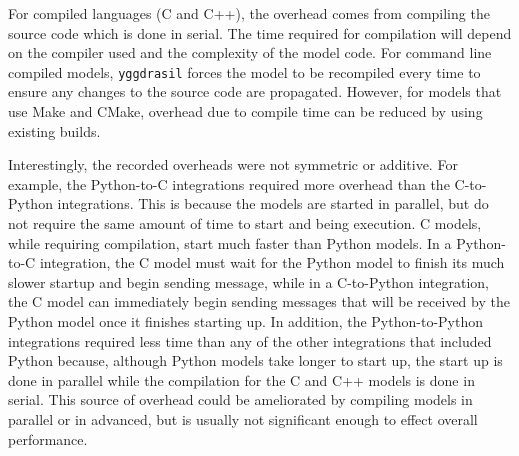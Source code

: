 \documentclass[journal]{IEEEtran}
\newcommand{\pkg}{{\tt yggdrasil}{}}
\begin{document}
For compiled languages (C and C++), the overhead comes from compiling the source code which is done in serial. The time required for compilation will depend on the compiler used and the complexity of the model code. For command line compiled models, {\pkg} forces the model to be recompiled every time to ensure any changes to the source code are propagated. However, for models that use Make and CMake, overhead due to compile time can be reduced by using existing builds.

Interestingly, the recorded overheads were not symmetric or additive. For example, the Python-to-C integrations required more overhead than the C-to-Python integrations. This is because the models are started in parallel, but do not require the same amount of time to start and being execution. C models, while requiring compilation, start much faster than Python models. In a Python-to-C integration, the C model must wait for the Python model to finish its much slower startup and begin sending message, while in a C-to-Python integration, the C model can immediately begin sending messages that will be received by the Python model once it finishes starting up. In addition, the Python-to-Python integrations required less time than any of the other integrations that included Python because, although Python models take longer to start up, the start up is done in parallel while the compilation for the C and C++ models is done in serial. This source of overhead could be ameliorated by compiling models in parallel or in advanced, but is usually not significant enough to effect overall performance.


\end{document}
